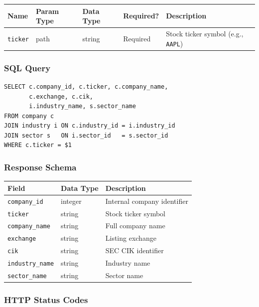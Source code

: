 \documentclass[11pt]{article}
\begin{document}
\begin{center}
\small
\begin{tabular}{l l l l p{5cm}}
\toprule
\textbf{Name} & \textbf{Param Type} & \textbf{Data Type} & \textbf{Required?} & \textbf{Description} \\
\midrule
\texttt{ticker} & path & string & Required & Stock ticker symbol (e.g., \texttt{AAPL}) \\
\bottomrule
\end{tabular}
\end{center}

\subsubsection*{SQL Query}
\begin{lstlisting}[style=sql,basicstyle=\ttfamily\scriptsize]
SELECT c.company_id, c.ticker, c.company_name,
       c.exchange, c.cik,
       i.industry_name, s.sector_name
FROM company c
JOIN industry i ON c.industry_id = i.industry_id
JOIN sector s   ON i.sector_id   = s.sector_id
WHERE c.ticker = $1
\end{lstlisting}

\subsubsection*{Response Schema}

\begin{center}
\small
\begin{tabular}{l l p{7cm}}
\toprule
\textbf{Field} & \textbf{Data Type} & \textbf{Description} \\
\midrule
\texttt{company\_id}    & integer & Internal company identifier \\
\texttt{ticker}         & string  & Stock ticker symbol \\
\texttt{company\_name}  & string  & Full company name \\
\texttt{exchange}       & string  & Listing exchange \\
\texttt{cik}            & string  & SEC CIK identifier \\
\texttt{industry\_name} & string  & Industry name \\
\texttt{sector\_name}   & string  & Sector name \\
\bottomrule
\end{tabular}
\end{center}

\subsubsection*{HTTP Status Codes}
\end{document}

